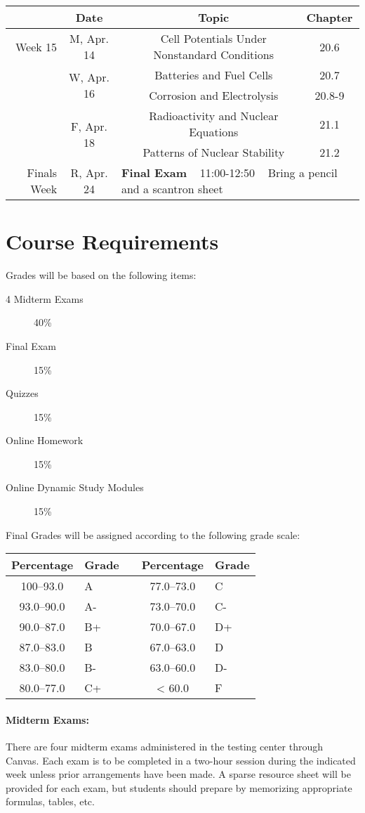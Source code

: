 \documentclass[12pt, letterpaper]{article}
\begin{document}
\begin{tabular}{rcccc}
& Date && Topic & Chapter\\
\midrule
Week 15 & M, Apr. 14&& Cell Potentials Under Nonstandard Conditions & 20.6\\
& \multirow{2}{*}{W, Apr. 16}& & Batteries and Fuel Cells & 20.7\\
& & & Corrosion and Electrolysis & 20.8-9\\
& \multirow{2}{*}{F, Apr. 18}& & Radioactivity and Nuclear Equations & 21.1\\
& & & Patterns of Nuclear Stability & 21.2\\
\midrule
\midrule
Finals Week & R, Apr. 24 & \multicolumn{3}{l}{\textbf{Final Exam} ~ 11:00-12:50 ~ Bring a pencil and a scantron sheet}\\
\end{tabular}

\section*{Course Requirements}
Grades will be based on the following items:
\begin{description}
	\item[4 Midterm Exams] 40\%
	\item[Final Exam] 15\%
	\item[Quizzes] 15\%
	\item[Online Homework] 15\%
	\item[Online Dynamic Study Modules] 15\%
\end{description}
Final Grades will be assigned according to the following grade scale:

\begin{tabular}{cl|c|cl}
	Percentage & Grade &  & Percentage & Grade \\ \midrule
	100--93.0  & A     &  & 77.0--73.0 & C     \\
	93.0--90.0 & A-    &  & 73.0--70.0 & C-    \\
	90.0--87.0 & B+    &  & 70.0--67.0 & D+    \\
	87.0--83.0 & B     &  & 67.0--63.0 & D     \\
	83.0--80.0 & B-    &  & 63.0--60.0 & D-    \\
	80.0--77.0 & C+    &  & < 60.0     & F
\end{tabular}

\paragraph{Midterm Exams:}
There are four midterm exams administered in the testing center through Canvas. Each exam is to be completed in a two-hour session during the indicated week unless prior arrangements have been made. A sparse resource sheet will be provided for each exam, but students should prepare by memorizing appropriate formulas, tables, etc.
\end{document}
